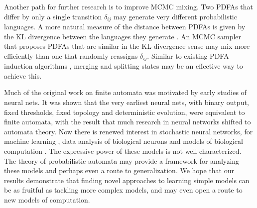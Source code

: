 Another path for further research is to improve MCMC mixing.  Two PDFAs that differ by only a single transition $\delta_{ij}$ may generate very different probabilistic languages.  A more natural measure of the distance between PDFAs is given by the KL divergence between the languages they generate \cite{Carrasco1994}.  An MCMC sampler that proposes PDFAs that are similar in the KL divergence sense may mix more efficiently than one that randomly reassigns $\delta_{ij}$.  Similar to existing PDFA induction algorithms \cite{Shalizi2004,Thollard2000}, merging and splitting states may be an effective way to achieve this.

Much of the original work on finite automata was motivated by early studies of neural nets\cite{Hopcroft1979}.  It was shown that the very earliest neural nets, with binary output, fixed thresholds, fixed topology and deterministic evolution, were equivalent to finite automata\cite{Kleene1956}, with the result that much research in neural networks shifted to automata theory.  Now there is renewed interest in stochastic neural networks, for machine learning \cite{Hinton2006}, data analysis of biological neurons \cite{Paninski} and models of biological computation \cite{Pouget? Lengyel? Fiser?}.  The expressive power of these models is not well characterized.  The theory of probabilistic automata may provide a framework for analyzing these models and perhaps even a route to generalization.  We hope that our results demonstrate that finding novel approaches to learning simple models can be as fruitful as tackling more complex models, and may even open a route to new models of computation.